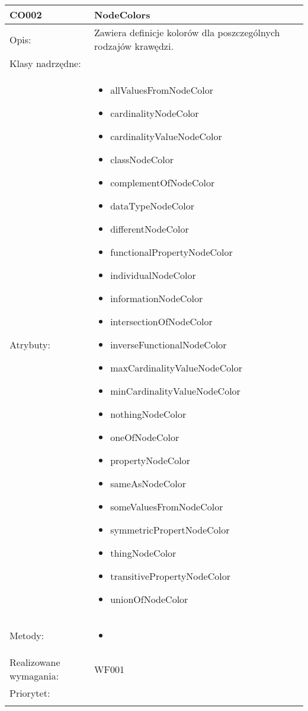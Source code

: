 \documentclass[a4paper,10pt]{article}
\begin{document}
\begin{center}
\begin{longtable}{|m{3cm}|m{9cm}|}
CO002 & NodeColors \\ \hline
Opis: & Zawiera definicje kolorów dla poszczególnych rodzajów krawędzi.   \\ \hline
Klasy nadrzędne: &     \\ \hline
Atrybuty: & \begin{itemize}
 \item allValuesFromNodeColor
 \item cardinalityNodeColor
 \item cardinalityValueNodeColor
 \item classNodeColor
 \item complementOfNodeColor
 \item dataTypeNodeColor
 \item differentNodeColor
 \item functionalPropertyNodeColor
 \item individualNodeColor
 \item informationNodeColor
 \item intersectionOfNodeColor
 \item inverseFunctionalNodeColor
 \item maxCardinalityValueNodeColor
 \item minCardinalityValueNodeColor
 \item nothingNodeColor
 \item oneOfNodeColor
 \item propertyNodeColor
 \item sameAsNodeColor
 \item someValuesFromNodeColor
 \item symmetricPropertNodeColor
 \item thingNodeColor
 \item transitivePropertyNodeColor
 \item unionOfNodeColor 
\end{itemize}
 \\ \hline
Metody: & \begin{itemize}
 \item 
\end{itemize}
  \\ \hline
Realizowane wymagania: & WF001 \\ \hline
Priorytet: &  \\ \hline

\multicolumn{2}{c}{} \\
 \hline

\end{longtable}


\end{center}
\end{document}
